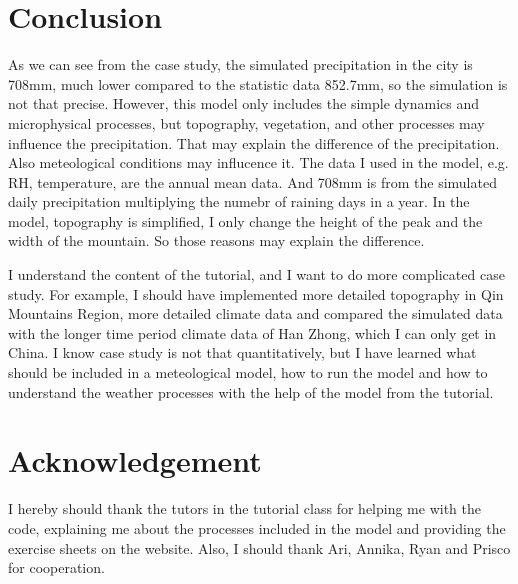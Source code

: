 \section{Conclusion}\label{sec:Ecotoxicology}
As we can see from the case study, the simulated precipitation in the city is 708mm, much lower compared to the statistic data 852.7mm, so the simulation is not that precise. However, this model only includes the simple dynamics and microphysical processes, but topography, vegetation, and other processes may influence the precipitation. That may explain the difference of the precipitation. Also meteological conditions may influcence it. The data I used in the model, e.g. RH, temperature, are the annual mean data. And 708mm is from the simulated daily precipitation multiplying the numebr of raining days in a year. In the model, topography is simplified, I only change the height of the peak and the width of the mountain. So those reasons may explain the difference.

I understand the content of the tutorial, and I want to do more complicated case study. For example, I should have implemented more detailed topography in Qin Mountains Region, more detailed climate data and compared the simulated data with the longer time period climate data of Han Zhong, which I can only get in China.  I know case study is not that quantitatively, but I have learned what should be included in a meteological model, how to run the model and how to understand the weather processes with the help of the model from the tutorial. 

\section{Acknowledgement}
I hereby should thank the tutors in the tutorial class for helping me with the code, explaining me about the processes included in the model and providing the exercise sheets on the website. Also, I should thank Ari, Annika, Ryan and Prisco for cooperation. 
















